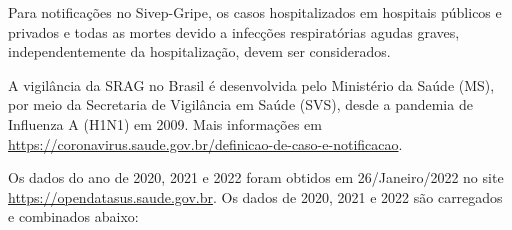 \documentclass[
]{article}
\newenvironment{Shaded}{\begin{snugshade}}{\end{snugshade}}
\newcommand{\DecValTok}[1]{\textcolor[rgb]{0.00,0.00,0.81}{#1}}
\newcommand{\DocumentationTok}[1]{\textcolor[rgb]{0.56,0.35,0.01}{\textbf{\textit{#1}}}}
\newcommand{\FunctionTok}[1]{\textcolor[rgb]{0.00,0.00,0.00}{#1}}
\newcommand{\NormalTok}[1]{#1}
\newcommand{\OtherTok}[1]{\textcolor[rgb]{0.56,0.35,0.01}{#1}}
\newcommand{\SpecialCharTok}[1]{\textcolor[rgb]{0.00,0.00,0.00}{#1}}
\newcommand{\StringTok}[1]{\textcolor[rgb]{0.31,0.60,0.02}{#1}}
\begin{document}
Para notificações no Sivep-Gripe, os casos hospitalizados em hospitais
públicos e privados e todas as mortes devido a infecções respiratórias
agudas graves, independentemente da hospitalização, devem ser
considerados.

A vigilância da SRAG no Brasil é desenvolvida pelo Ministério da Saúde
(MS), por meio da Secretaria de Vigilância em Saúde (SVS), desde a
pandemia de Influenza A (H1N1) em 2009. Mais informações em
\url{https://coronavirus.saude.gov.br/definicao-de-caso-e-notificacao}.

Os dados do ano de 2020, 2021 e 2022 foram obtidos em 26/Janeiro/2022 no
site \url{https://opendatasus.saude.gov.br}. Os dados de 2020, 2021 e
2022 são carregados e combinados abaixo:

\begin{Shaded}
\end{Shaded}
\end{document}

